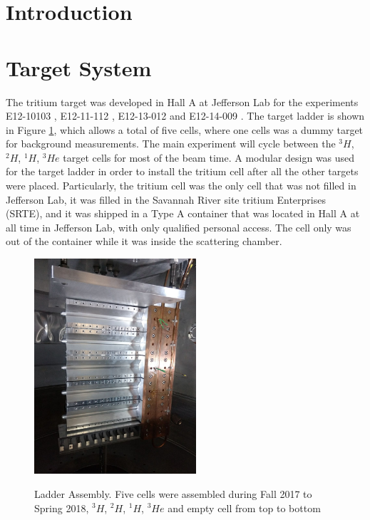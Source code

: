 \documentclass[final,5p,times,twocolumn]{elsarticle}
\begin{document}

\section{Introduction}
\label{}

\section{Target System}


The tritium target was developed in Hall A at Jefferson Lab for the experiments E12-10103 \cite{marathon}, E12-11-112 \cite{E12-11-112}, E12-13-012 \cite{E12-13-012} and E12-14-009 \cite{E12-14-009}. The target ladder is shown in Figure \ref{ladder}, which allows a total of five cells, where one cells was a dummy target for background measurements. The main experiment will cycle between the $^{3}H$, $^{2}H$, $^{1}H $, $^{3}He$ target cells for most of the beam time. A modular design was used for the target ladder in order to install the tritium cell after all the other targets were placed. Particularly, the tritium cell was the only cell that was not filled in Jefferson Lab, it was filled in the Savannah River site tritium Enterprises (SRTE), and it was shipped in a Type A container that was located in Hall A at all time in Jefferson Lab, with only qualified personal access. The cell only was out of the container while it was inside the scattering chamber.

\begin{figure}
\centering
  \includegraphics[width=6cm]{images/ladder.jpg}\\
  \caption{Ladder Assembly. Five cells were assembled during Fall 2017 to Spring 2018, $^{3}H$, $^{2}H$, $^{1}H $, $^{3}He$ and empty cell from top to bottom
 }\label{ladder}
\end{figure}
\end{document}

